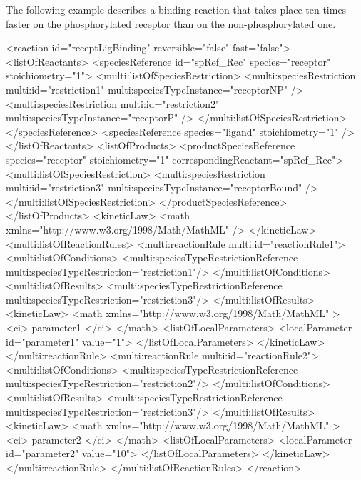 The following example describes a binding reaction that takes place ten times faster on the phosphorylated receptor than on the non-phosphorylated one.

\begin{example}
<reaction id="receptLigBinding" reversible="false" fast="false"> 
  <listOfReactants>
    <speciesReference id="spRef_Rec" species="receptor" stoichiometry="1">
      <multi:listOfSpeciesRestriction>
        <multi:speciesRestriction multi:id="restriction1" 
                                  multi:speciesTypeInstance="receptorNP" />
        <multi:speciesRestriction multi:id="restriction2"
                                  multi:speciesTypeInstance="receptorP" />
      </multi:listOfSpeciesRestriction>
    </speciesReference>
    <speciesReference species="ligand" stoichiometry="1" />
  </listOfReactants>
  <listOfProducts>
    <productSpeciesReference species="receptor" stoichiometry="1" 
                      correspondingReactant="spRef_Rec">
      <multi:listOfSpeciesRestriction>
        <multi:speciesRestriction multi:id="restriction3"
                                  multi:speciesTypeInstance="receptorBound" />
      </multi:listOfSpeciesRestriction>
    </productSpeciesReference>
  </listOfProducts>
  <kineticLaw>
    <math xmlns="http://www.w3.org/1998/Math/MathML" />
  </kineticLaw>
  <multi:listOfReactionRules>
    <multi:reactionRule multi:id="reactionRule1">
      <multi:listOfConditions>
        <multi:speciesTypeRestrictionReference multi:speciesTypeRestriction="restriction1"/>
      </multi:listOfConditions>
      <multi:listOfResults>
        <multi:speciesTypeRestrictionReference multi:speciesTypeRestriction="restriction3"/>
      </multi:listOfResults>
      <kineticLaw>
        <math xmlns="http://www.w3.org/1998/Math/MathML" >
          <ci> parameter1 </ci>
        </math>
        <listOfLocalParameters>
          <localParameter id="parameter1" value="1">
        </listOfLocalParameters>
      </kineticLaw>
    </multi:reactionRule>
    <multi:reactionRule multi:id="reactionRule2">
      <multi:listOfConditions>
        <multi:speciesTypeRestrictionReference multi:speciesTypeRestriction="restriction2"/>
      </multi:listOfConditions>
      <multi:listOfResults>
        <multi:speciesTypeRestrictionReference multi:speciesTypeRestriction="restriction3"/>
      </multi:listOfResults>
      <kineticLaw>
        <math xmlns="http://www.w3.org/1998/Math/MathML" >
          <ci> parameter2 </ci>
        </math>
        <listOfLocalParameters>
          <localParameter id="parameter2" value="10">
        </listOfLocalParameters>
      </kineticLaw>
    </multi:reactionRule>
  </multi:listOfReactionRules>
</reaction>
\end{example}
